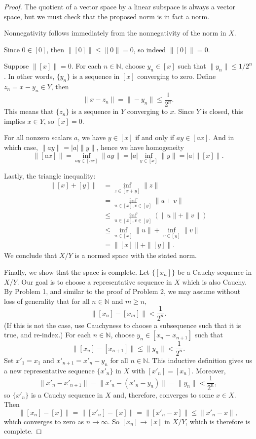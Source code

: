 \documentclass[12pt]{article}
\theoremstyle{definition}
\newcommand{\N}{\mathbb{N}}
\newcommand{\<}{\langle}
\renewcommand{\>}{\rangle}
\begin{document}
\begin{proof}
    The quotient of a vector space by a linear subspace is always a vector space, but we must check that the proposed norm is in fact a norm.

    Nonnegativity follows immediately from the nonnegativity of the norm in $X$.

    Since $0 \in [0]$, then $\|[0]\| \leq \|0\| = 0$, so indeed $\|[0]\| = 0$.

    Suppose $\|[x]\| = 0$.
    For each $n \in \N$, choose $y_n \in [x]$ such that $\|y_n\| \leq 1/2^n$.
    In other words, $\{y_n\}$ is a sequence in $[x]$ converging to zero.
    Define $z_n = x - y_n \in Y$, then
    \[
        \|x - z_n\| = \|-y_n\| \leq \frac{1}{2^n}.
    \]
    This means that $\{z_n\}$ is a sequence in $Y$ converging to $x$.
    Since $Y$ is closed, this implies $x \in Y$, so $[x] = 0$.

    For all nonzero scalars $a$, we have $y \in [x]$ if and only if $ay \in [ax]$.
    And in which case, $\|ay\| = |a|\|y\|$, hence we have homogeneity
    \[
        \|[ax]\| = \inf_{ay \in [ax]}\|ay\| = |a|\inf_{y \in [x]}\|y\| = |a|\|[x]\|.
    \]

    Lastly, the triangle inequality:
    \begin{align*}
        \|[x] + [y]\|
            &= \inf_{z \in [x + y]}\|z\| \\
            &= \inf_{u \in [x], v \in [y]}\|u + v\| \\
            &\leq \inf_{u \in [x], v \in [y]}(\|u\| + \|v\|) \\
            &\leq \inf_{u \in [x]}\|u\| + \inf_{v \in [y]}\|v\| \\
            &= \|[x]\| + \|[y]\|.
    \end{align*}
    We conclude that $X/Y$ is a normed space with the stated norm.

    Finally, we show that the space is complete.
    Let $\{[x_n]\}$ be a Cauchy sequence in $X/Y$.
    Our goal is to choose a representative sequence in $X$ which is also Cauchy.
    By Problem 1, and similar to the proof of Problem 2, we may assume without loss of generality that for all $n \in \N$ and $m \geq n$,
    \[
        \|[x_n] - [x_m]\| < \frac{1}{2^n}.
    \]
    (If this is not the case, use Cauchyness to choose a subsequence such that it is true, and re-index.)
    For each $n \in \N$, choose $y_n \in [x_n - x_{n+1}]$ such that 
    \[
        \|[x_n] - [x_{n+1}]\| \leq \|y_n\| < \frac{1}{2^n}.
    \]
    Set $x'_1 = x_1$ and $x'_{n+1} = x'_n - y_n$ for all $n \in \N$.
    This inductive definition gives us a new representative sequence $\{x'_n\}$ in $X$ with $[x'_n] = [x_n]$.
    Moreover,
    \[
        \|x'_n - x'_{n+1}\| = \|x'_n - (x'_n - y_n)\| = \|y_n\| < \frac{1}{2^n},
    \]
    so $\{x'_n\}$ is a Cauchy sequence in $X$ and, therefore, converges to some $x \in X$.
    Then
    \[
        \|[x_n] - [x]\|
            = \|[x'_n] - [x]\|
            = \|[x'_n - x]\|
            \leq \|x'_n - x\|,
    \]
    which converges to zero as $n \to \infty$.
    So $[x_n] \to [x]$ in $X/Y$, which is therefore is complete.
\end{proof}
\end{document}
